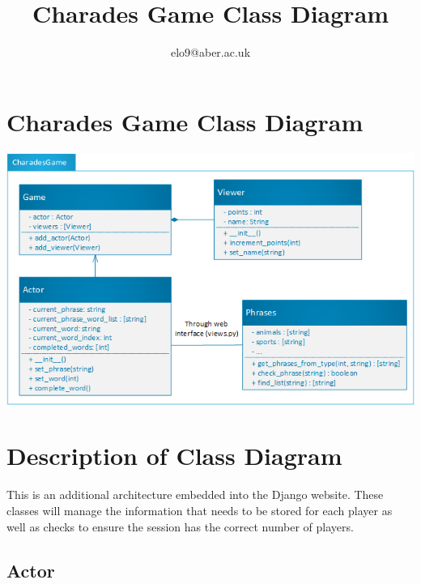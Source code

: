 \documentclass{article}
\title{Charades Game Class Diagram}
\author{elo9@aber.ac.uk}
\begin{document}
\maketitle
\tableofcontents

\newpage

\section{Charades Game Class Diagram}
\includegraphics[width=\textwidth]{CharadesGameClass}


\section{Description of Class Diagram}
This is an additional architecture embedded into the Django website. These classes will manage the information that needs to be stored for each player as well as checks to ensure the session has the correct number of players. 

\subsection{Actor}
\end{document}
